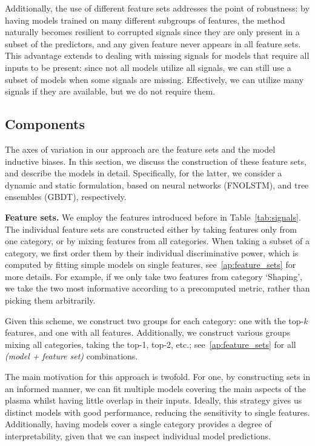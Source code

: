 Additionally, the use of different feature sets addresses the point of robustness: by having models trained on many different subgroups of features, the method naturally becomes resilient to corrupted signals since they are only present in a subset of the predictors, and any given feature never appears in all feature sets. This advantage extends to dealing with missing signals for models that require all inputs to be present: since not all models utilize all signals, we can still use a subset of models when some signals are missing. Effectively, we can utilize many signals if they are available, but we do not require them.

\subsection{Components}\label{sec:components}
The axes of variation in our approach are the feature sets and the model inductive biases. In this section, we discuss the construction of these feature sets, and describe the models in detail. Specifically, for the latter, we consider a dynamic and static formulation, based on neural networks (FNOLSTM), and tree ensembles (GBDT), respectively.

\textbf{Feature sets.}
We employ the features introduced before in Table~\ref{tab:signals}. The individual feature sets are constructed either by taking features only from one category, or by mixing features from all categories. When taking a subset of a category, we first order them by their individual discriminative power, which is computed by fitting simple models on single features, see~\ref{ap:feature_sets} for more details. For example, if we only take two features from category `Shaping', we take the two most informative according to a precomputed metric, rather than picking them arbitrarily. 

Given this scheme, we construct two groups for each category: one with the top-$k$ features, and one with all features. Additionally, we construct various groups mixing all categories, taking the top-1, top-2, etc.; see~\ref{ap:feature_sets} for all \textit{(model + feature set)} combinations. 

The main motivation for this approach is twofold. For one, by constructing sets in an informed manner, we can fit multiple models covering the main aspects of the plasma whilst having little overlap in their inputs. Ideally, this strategy gives us distinct models with good performance,  reducing the sensitivity to single features. Additionally, having models cover a single category provides a degree of interpretability, given that we can inspect individual model predictions.


